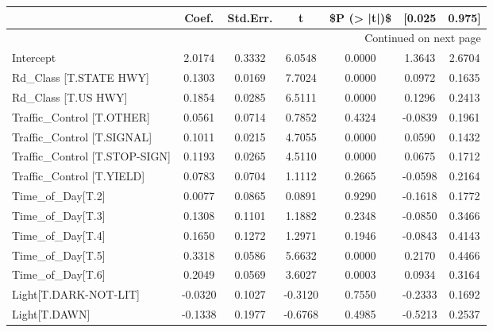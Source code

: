 \begin{longtable}{p{4cm}cccccc}
\toprule
{} &   Coef. &  Std.Err. &       t &  \$P (> |t|)\$ &  [0.025 &  0.975] \\
\midrule
\endhead
\midrule
\multicolumn{7}{r}{{Continued on next page}} \\
\midrule
\endfoot

\bottomrule
\endlastfoot
Intercept                                          &  2.0174 &    0.3332 &  6.0548 &       0.0000 &  1.3643 &  2.6704 \\
Rd\_Class [T.STATE HWY]                             &  0.1303 &    0.0169 &  7.7024 &       0.0000 &  0.0972 &  0.1635 \\
Rd\_Class [T.US HWY]                                &  0.1854 &    0.0285 &  6.5111 &       0.0000 &  0.1296 &  0.2413 \\
Traffic\_Control [T.OTHER]                          &  0.0561 &    0.0714 &  0.7852 &       0.4324 & -0.0839 &  0.1961 \\
Traffic\_Control [T.SIGNAL]                         &  0.1011 &    0.0215 &  4.7055 &       0.0000 &  0.0590 &  0.1432 \\
Traffic\_Control [T.STOP-SIGN]                      &  0.1193 &    0.0265 &  4.5110 &       0.0000 &  0.0675 &  0.1712 \\
Traffic\_Control [T.YIELD]                          &  0.0783 &    0.0704 &  1.1112 &       0.2665 & -0.0598 &  0.2164 \\
Time\_of\_Day[T.2]                                   &  0.0077 &    0.0865 &  0.0891 &       0.9290 & -0.1618 &  0.1772 \\
Time\_of\_Day[T.3]                                   &  0.1308 &    0.1101 &  1.1882 &       0.2348 & -0.0850 &  0.3466 \\
Time\_of\_Day[T.4]                                   &  0.1650 &    0.1272 &  1.2971 &       0.1946 & -0.0843 &  0.4143 \\
Time\_of\_Day[T.5]                                   &  0.3318 &    0.0586 &  5.6632 &       0.0000 &  0.2170 &  0.4466 \\
Time\_of\_Day[T.6]                                   &  0.2049 &    0.0569 &  3.6027 &       0.0003 &  0.0934 &  0.3164 \\
Light[T.DARK-NOT-LIT]                              & -0.0320 &    0.1027 & -0.3120 &       0.7550 & -0.2333 &  0.1692 \\
Light[T.DAWN]                                      & -0.1338 &    0.1977 & -0.6768 &       0.4985 & -0.5213 &  0.2537 \\

\end{longtable}
